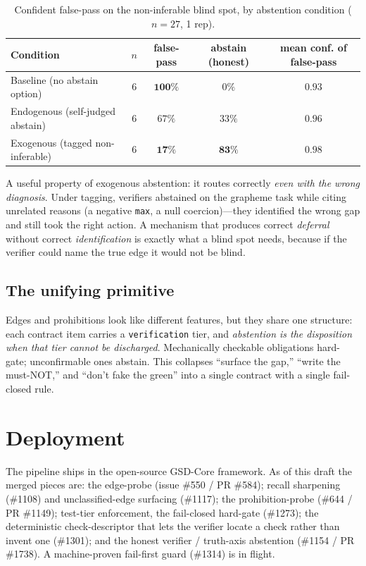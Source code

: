 \documentclass[11pt]{article}
\newcommand{\code}[1]{\texttt{#1}}
\begin{document}
\begin{table}[h]
\centering
\caption{Confident false-pass on the non-inferable blind spot, by abstention condition
($n=27$, 1 rep).}
\label{tab:t3}
\small\setlength{\tabcolsep}{4pt}%
\begin{tabular}{lcccc}
\toprule
\textbf{Condition} & $n$ & \textbf{false-pass} & \textbf{abstain (honest)} & \textbf{mean conf. of false-pass} \\
\midrule
Baseline (no abstain option)        & 6 & $\mathbf{100\%}$ & $0\%$  & $0.93$ \\
Endogenous (self-judged abstain)    & 6 & $67\%$ & $33\%$ & $0.96$ \\
Exogenous (tagged non-inferable)    & 6 & $\mathbf{17\%}$ & $\mathbf{83\%}$ & $0.98$ \\
\bottomrule
\end{tabular}
\end{table}

A useful property of exogenous abstention: it routes correctly \emph{even with the wrong diagnosis}.
Under tagging, verifiers abstained on the grapheme task while citing unrelated reasons (a negative
\code{max}, a null coercion)---they identified the wrong gap and still took the right action. A
mechanism that produces correct \emph{deferral} without correct \emph{identification} is exactly what
a blind spot needs, because if the verifier could name the true edge it would not be blind.

\subsection{The unifying primitive}
Edges and prohibitions look like different features, but they share one structure: each contract item
carries a \texttt{verification} tier, and \emph{abstention is the disposition when that tier cannot be
discharged}. Mechanically checkable obligations hard-gate; unconfirmable ones abstain. This collapses
``surface the gap,'' ``write the must-NOT,'' and ``don't fake the green'' into a single contract with
a single fail-closed rule.

\section{Deployment}
\label{sec:deployment}

The pipeline ships in the open-source GSD-Core framework. As of this draft the merged pieces are:
the edge-probe (issue \#550 / PR \#584); recall sharpening (\#1108) and unclassified-edge surfacing
(\#1117); the prohibition-probe (\#644 / PR \#1149); test-tier enforcement, the fail-closed hard-gate
(\#1273); the deterministic check-descriptor that lets the verifier locate a check rather than invent
one (\#1301); and the honest verifier / truth-axis abstention (\#1154 / PR \#1738). A
machine-proven fail-first guard (\#1314) is in flight.
\end{document}
